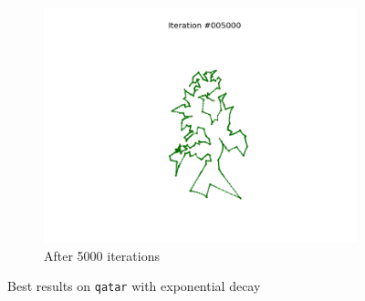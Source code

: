 \documentclass[11pt]{article}
\begin{document}
\begin{figure}
\begin{subfigure}{.33\textwidth}
  \includegraphics[trim={6cm 2cm 6cm 2cm}, clip=true,width=\linewidth]{q_5000.png}
  \caption{After 5000 iterations}
\end{subfigure}
\caption{Best results on \texttt{qatar} with exponential decay}
\label{fig:bqatar}

\end{figure}
\end{document}
